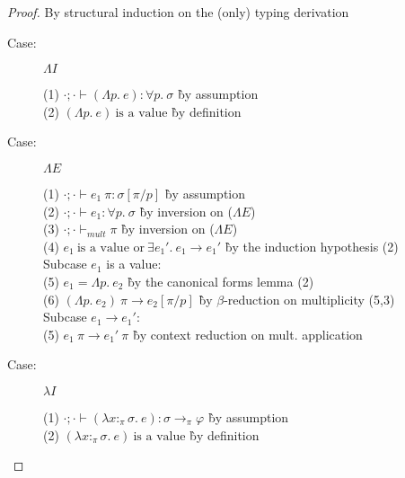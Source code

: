 
\ProgressTheorem

\begin{proof}
By structural induction on the (only) typing derivation

\begin{description}

\item[Case:] $\Lambda I$
\begin{tabbing}
(1) $\cdot; \cdot \vdash (\Lambda p.~e) : \forall p.~\sigma$ \` by assumption \\
(2) $(\Lambda p.~e)~\textrm{is a value}$ \` by definition \\
\end{tabbing}

\item[Case:] $\Lambda E$
\begin{tabbing}
(1) $\cdot; \cdot \vdash e_1~\pi : \sigma[\pi/p]$ \` by assumption \\
(2) $\cdot; \cdot \vdash e_1 : \forall p.~\sigma$ \` by inversion on ($\Lambda E$) \\
(3) $\cdot; \cdot \vdash_{mult} \pi$ \` by inversion on ($\Lambda E$) \\
(4) $e_1~\textrm{is a value or}~\exists e_1'.~e_1 \longrightarrow e_1'$ \` by the induction hypothesis (2) \\
\textrm{Subcase $e_1$ is a value:}\\
(5) $e_1 = \Lambda p.~e_2$ \` by the canonical forms lemma (2) \\
(6) $(\Lambda p.~e_2)~\pi \longrightarrow e_2[\pi/p]$ \` by $\beta$-reduction on multiplicity (5,3) \\
\textrm{Subcase $e_1 \longrightarrow e_1'$:}\\
(5) $e_1~\pi \longrightarrow e_1'~\pi$ \` by context reduction on mult. application \\
\end{tabbing}

\item[Case:] $\lambda I$
\begin{tabbing}
(1) $\cdot; \cdot \vdash (\lambda x{:}_\pi\sigma.~e) : \sigma\to_\pi\varphi$ \` by assumption \\
(2) $(\lambda x{:}_\pi\sigma.~e)~\textrm{is a value}$ \` by definition \\
\end{tabbing}


\end{description}
\end{proof}
